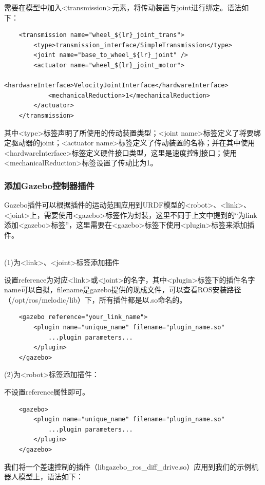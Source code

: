 \documentclass[10pt, oneside]{book}
\begin{document}
需要在模型中加入<transmission>元素，将传动装置与joint进行绑定。语法如下：

\begin{verbatim}
    <transmission name="wheel_${lr}_joint_trans">
        <type>transmission_interface/SimpleTransmission</type>
        <joint name="base_to_wheel_${lr}_joint" />
        <actuator name="wheel_${lr}_joint_motor">
            <hardwareInterface>VelocityJointInterface</hardwareInterface>
            <mechanicalReduction>1</mechanicalReduction>
        </actuator>
    </transmission>
\end{verbatim}

其中<type>标签声明了所使用的传动装置类型；<joint name>标签定义了将要绑定驱动器的joint；<actuator name>标签定义了传动装置的名称；并在其中使用<hardwareInterface>标签定义硬件接口类型，这里是速度控制接口；使用<mechanicalReduction>标签设置了传动比为1。

\subsubsection{添加Gazebo控制器插件}

Gazebo插件可以根据插件的运动范围应用到URDF模型的<robot>、<link>、<joint>上，需要使用<gazebo>标签作为封装，这里不同于上文中提到的“为link添加<gazebo>标签”，这里需要在<gazebo>标签下使用<plugin>标签来添加插件。

~\\
\noindent(1)为<link>、<joint>标签添加插件

设置reference为对应<link>或<joint>的名字，其中<plugin>标签下的插件名字name可以自拟，filename是gazebo提供的现成文件，可以查看ROS安装路径（/opt/ros/melodic/lib）下，所有插件都是以.so命名的。

\begin{verbatim}
    <gazebo reference="your_link_name">
        <plugin name="unique_name" filename="plugin_name.so"
            ...plugin parameters...
        </plugin>
    </gazebo>
\end{verbatim}

\noindent(2)为<robot>标签添加插件：

不设置reference属性即可。

\begin{verbatim}
    <gazebo>
        <plugin name="unique_name" filename="plugin_name.so"
            ...plugin parameters...
        </plugin>
    </gazebo>
\end{verbatim}

我们将一个差速控制的插件（libgazebo\_ros\_diff\_drive.so）应用到我们的示例机器人模型上，语法如下：
\end{document}

